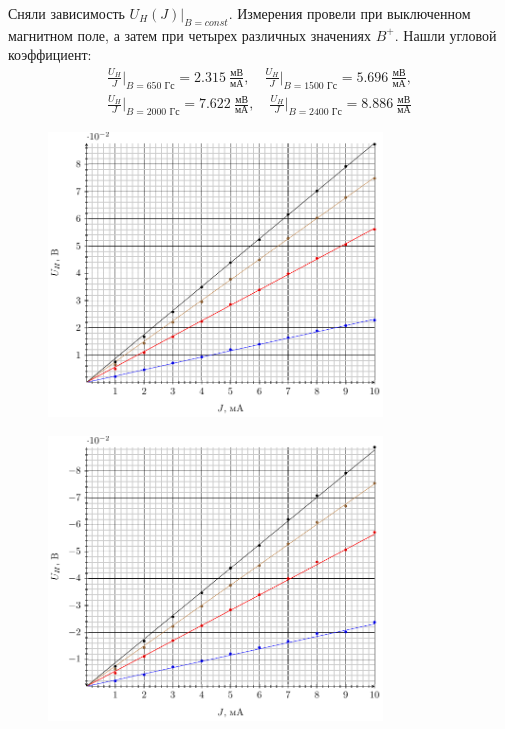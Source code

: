 Сняли зависимость $U_{H}(J)|_{B=const}$. Измерения провели при выключенном
магнитном поле, а затем при четырех различных значениях $B^{+}$.
Нашли угловой коэффициент:
\begin{gather}
	\frac{U_H}{J}\bigg|_{B=650\text{ Гс}}=2.315\ \frac{\text{мВ}}{\text{мА}},\quad
	\frac{U_H}{J}\bigg|_{B=1500\text{ Гс}}=5.696\ \frac{\text{мВ}}{\text{мА}},\\
	\frac{U_H}{J}\bigg|_{B=2000\text{ Гс}}=7.622\ \frac{\text{мВ}}{\text{мА}},\quad
	\frac{U_H}{J}\bigg|_{B=2400\text{ Гс}}=8.886\ \frac{\text{мВ}}{\text{мА}}
\end{gather}
\begin{figure}[H]
	\centering
	\includegraphics[width=0.79\textwidth]{img/UHp}
	\label{fig:uhp}
\end{figure}
\begin{figure}[H]
	\centering
	\includegraphics[width=0.79\textwidth]{img/UHm}
	\label{fig:uhm}
\end{figure}
